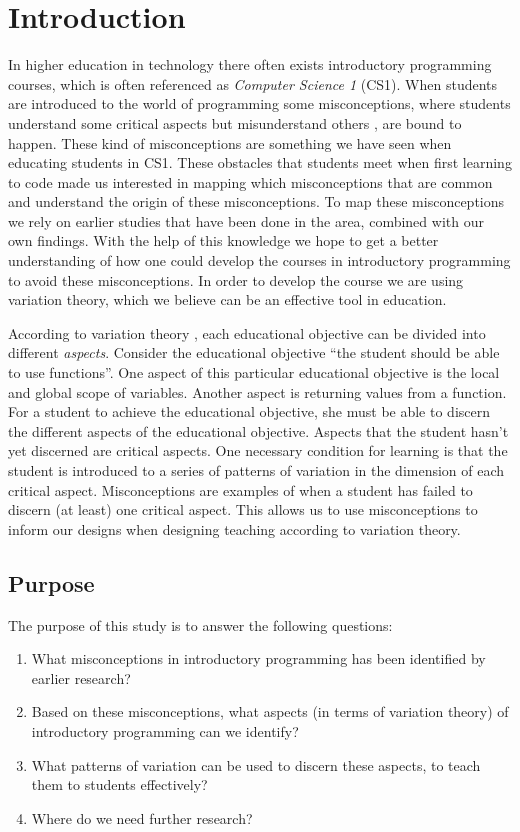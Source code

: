 \section{Introduction}


In higher education in technology there often exists introductory 
programming courses, which is often referenced as \emph{Computer Science 1} 
(CS1). When students are introduced to the world of programming some
misconceptions, where students understand some critical aspects but 
misunderstand others \parencite{NCOL}, are bound to happen. These kind of 
misconceptions are something we have seen when educating students in CS1. 
These obstacles that students meet when first learning to code made us 
interested in mapping which misconceptions that are common and understand 
the origin of these misconceptions. To map these misconceptions we rely on 
earlier studies that have been done in the area, combined with our own 
findings. With the help of this knowledge we hope to get a better 
understanding of how one  could develop the courses in introductory 
programming to avoid these  misconceptions. In order to develop the course 
we are using variation theory, which we believe can be an effective tool in 
education. 

According to variation theory \parencite[Ch.~2]{NCOL}, each educational 
objective can be divided into different \emph{aspects}.
Consider the educational objective \enquote{the student should be able to 
use 
functions}.
One aspect of this particular educational objective is the local and global 
scope 
of variables.
Another aspect is returning values from a function.
For a student to achieve the educational objective, she must be able to 
discern 
the different aspects of the educational objective.
Aspects that the student hasn't yet discerned are critical aspects.
One necessary condition for learning is that the student is introduced to a 
series of patterns of variation in the dimension of each critical aspect.
Misconceptions are examples of when a student has failed to discern (at 
least) 
one critical aspect.
This allows us to use misconceptions to inform our designs when designing 
teaching according to variation theory.

\subsection{Purpose}

The purpose of this study is to answer the following questions:
\begin{enumerate}
  \item What misconceptions in introductory programming has been identified 
by 
    earlier research?
  \item Based on these misconceptions, what aspects (in terms of variation 
    theory) of introductory programming can we identify?
  \item What patterns of variation can be used to discern these aspects, to 
    teach them to students effectively?
  \item Where do we need further research?
\end{enumerate}
